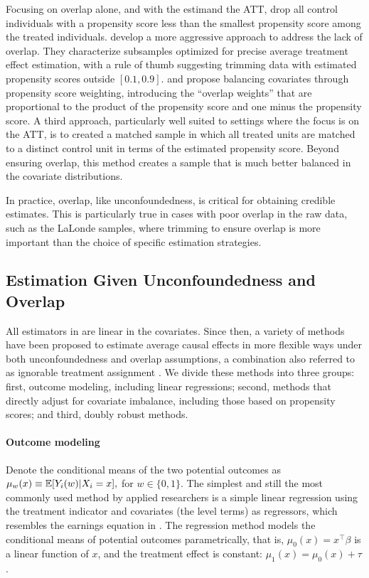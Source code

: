 \documentclass[letterpaper,12pt,leqno]{article}
\begin{document}
Focusing on overlap alone, and with the estimand the ATT, 
\citet{dehejiawahba} drop all control individuals with a propensity score less than the smallest propensity score among the treated individuals. \citet{crump2009dealing} develop a more aggressive approach to address the lack of overlap. They characterize subsamples optimized for precise average treatment effect estimation, with a rule of thumb suggesting trimming data with estimated propensity scores outside $[0.1, 0.9]$. \citet{crump2006moving} and \citet{li2018balancing} propose balancing covariates through propensity score weighting, introducing the ``overlap weights'' that are proportional to the product of the propensity score and one minus the propensity score. 
A third approach, particularly well suited to settings where the focus is on the ATT, is to created a matched sample in which all treated units are matched to a distinct control unit in terms of the estimated propensity score. Beyond ensuring overlap, this method creates a sample that is much better balanced in the covariate distributions.

In practice, overlap, like unconfoundedness, is critical for obtaining credible estimates. This is particularly true in cases with poor overlap in the raw data, such as the LaLonde samples, where trimming to ensure overlap is more important than the choice of specific estimation strategies.

\subsection{Estimation Given Unconfoundedness and Overlap}\label{s:estimation}

All estimators in \citet{LaLonde} are linear in the covariates. Since then, a variety of methods have been proposed to estimate average causal effects in more flexible ways under both unconfoundedness and overlap assumptions, a combination also referred to as ignorable treatment assignment \citep{rosenbaum1983central}. We divide these methods into three groups: first, outcome modeling, including linear regressions; second, methods that directly adjust for covariate imbalance, including those based on propensity scores; and third, doubly robust methods.

\paragraph{Outcome modeling} Denote the conditional means of the two potential outcomes as
$\mu_{w}(x) \equiv\mathbb{E}[Y_{i}(w)|X_i = x],$ for $ w \in \{0, 1\}$. The simplest and still the most commonly used method by applied researchers is a simple linear regression using the treatment indicator and covariates (the level terms) as regressors, which resembles the earnings equation in \citet{LaLonde}. The regression method models the conditional means of potential outcomes parametrically, that is, $\mu_{0}(x) = x^{\top} \beta$ is a linear function of $x$, and the treatment effect is constant: $\mu_{1}(x) = \mu_{0}(x) + \tau$. 
\end{document}
